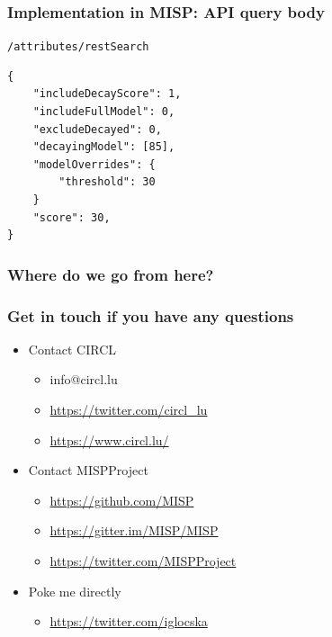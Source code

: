 \begin{frame}[fragile]
    \frametitle{Implementation in MISP: API query body}
    \texttt{/attributes/restSearch}
    \begin{lstlisting}
{
    "includeDecayScore": 1,
    "includeFullModel": 0,
    "excludeDecayed": 0,
    "decayingModel": [85],
    "modelOverrides": {
        "threshold": 30
    }
    "score": 30,
}
    \end{lstlisting}
\end{frame}

\begin{frame}
  \frametitle{Where do we go from here?}
\end{frame}


\begin{frame}
  \frametitle{Get in touch if you have any questions}
  \begin{itemize}
    \item Contact CIRCL
    \begin{itemize}
      \item info@circl.lu
      \item \url{https://twitter.com/circl_lu}
      \item \url{https://www.circl.lu/}
    \end{itemize}
    \item Contact MISPProject 
    \begin{itemize}
      \item \url{https://github.com/MISP}
      \item \url{https://gitter.im/MISP/MISP}
      \item \url{https://twitter.com/MISPProject}
    \end{itemize}
    \item Poke me directly
    \begin{itemize}
      \item \url{https://twitter.com/iglocska}
    \end{itemize}
  \end{itemize}
\end{frame}
